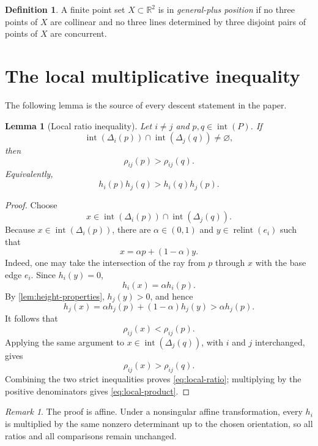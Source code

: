 \documentclass[final,5p,times,twocolumn]{elsarticle}
\newtheorem{lemma}[lemma]{Lemma}
\theoremstyle{definition}
\newtheorem{definition}[definition]{Definition}
\theoremstyle{remark}
\newtheorem{remark}[remark]{Remark}
\newcommand{\interior}[1]{\operatorname{int}(#1)}
\newcommand{\relint}{\operatorname{relint}}
\newcommand{\R}{\mathbb{R}}
\newcommand{\height}{h}
\newcommand{\ratio}{\rho}
\begin{document}
\begin{definition}
\label{def:general-plus}
A finite point set $X\subset\R^2$ is in \emph{general-plus position} if no three points of $X$ are collinear and no three lines determined by three disjoint pairs of points of $X$ are concurrent.
\end{definition}

\section{The local multiplicative inequality}
\label{sec:local}

The following lemma is the source of every descent statement in the paper.

\begin{lemma}[Local ratio inequality]
\label{lem:local-ratio}
Let $i\neq j$ and $p,q\in\interior P$. If
\[
\interior{\Delta_i(p)}\cap\interior{\Delta_j(q)}\neq\varnothing,
\]
then
\begin{equation}
\ratio_{ij}(p)>\ratio_{ij}(q).
\label{eq:local-ratio}
\end{equation}
Equivalently,
\begin{equation}
\height_i(p)\height_j(q)>
\height_i(q)\height_j(p).
\label{eq:local-product}
\end{equation}
\end{lemma}

\begin{proof}
Choose
\[
x\in\interior{\Delta_i(p)}\cap\interior{\Delta_j(q)}.
\]
Because $x\in\interior{\Delta_i(p)}$, there are $\alpha\in(0,1)$ and $y\in\relint(e_i)$ such that
\[
x=\alpha p+(1-\alpha)y.
\]
Indeed, one may take the intersection of the ray from $p$ through $x$ with the base edge $e_i$. Since $\height_i(y)=0$,
\[
\height_i(x)=\alpha\height_i(p).
\]
By \cref{lem:height-properties}, $\height_j(y)>0$, and hence
\[
\height_j(x)=\alpha\height_j(p)+(1-\alpha)\height_j(y)
>\alpha\height_j(p).
\]
It follows that
\[
\ratio_{ij}(x)<\ratio_{ij}(p).
\]
Applying the same argument to $x\in\interior{\Delta_j(q)}$, with $i$ and $j$ interchanged, gives
\[
\ratio_{ij}(x)>\ratio_{ij}(q).
\]
Combining the two strict inequalities proves \eqref{eq:local-ratio}; multiplying by the positive denominators gives \eqref{eq:local-product}.
\end{proof}

\begin{remark}
\label{rem:affine}
The proof is affine. Under a nonsingular affine transformation, every $\height_i$ is multiplied by the same nonzero determinant up to the chosen orientation, so all ratios and all comparisons remain unchanged.
\end{remark}
\end{document}
